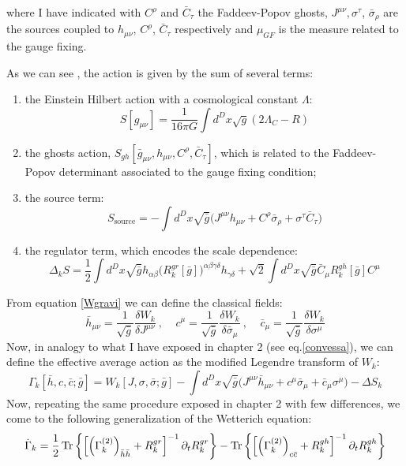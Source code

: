 where I have indicated with $C^\rho$ and $\bar{C}_\tau$ the Faddeev-Popov ghosts, $J^{\mu\nu}, \sigma^\tau$,  $\bar{\sigma}_\rho$ are the sources coupled to $h_{\mu\nu}$, $C^\rho$, $\bar{C}_\tau$ respectively and
$\mu_{GF}$ is the measure related to the gauge fixing.

As we can see , the action is given by the sum of several terms:
\begin{enumerate}
 \item the Einstein Hilbert action with a cosmological constant $\Lambda$:$$S[{g}_{\mu\nu}] = \frac{1}{16\pi G}\int d^D x \sqrt{g} (2\Lambda_C - R)$$ 
 \item the ghosts action, $S_{gh}[\bar{g}_{\mu\nu}, h_{\mu\nu}, C^\rho,\bar{C}_\tau]$, which is related to the Faddeev-Popov determinant associated to the gauge fixing condition;
 \item the source term:  $$ S_{\text{source}} = -\int d^D x \sqrt{\bar{g}} \big(J^{\mu\nu}h_{\mu\nu}+C^\rho\bar{\sigma}_\rho +\sigma^\tau\bar{C}_\tau\big)$$
 \item the regulator term, which encodes the scale dependence: $$\Delta_k S = \frac{1}{2} \int  d^D x \sqrt{\bar{g}}h_{\alpha\beta}\big(R_k^{gr}[\bar{g}]\big)^{\alpha\beta\gamma\delta}h_{\gamma\delta} + \sqrt{2} \int  d^D x \sqrt{\bar{g}}\bar{C}_\mu R_k^{gh}[\bar g]C^\mu$$
\end{enumerate}
From equation \eqref{Wgravi} we can define the classical fields:
\begin{equation}
 \bar{h}_{\mu\nu}=\frac{1}{\sqrt{\bar{g}}}\frac{\delta W_k}{\delta J^{\mu\nu}}\ , \ \ \ \ \ c^\mu=\frac{1}{\sqrt{\bar{g}}}\frac{\delta W_k}{\delta \bar{\sigma}_\mu}\ , \ \ \ \ \ \bar{c}_\mu=\frac{1}{\sqrt{\bar{g}}}\frac{\delta W_k}{\delta \sigma^\mu}
\end{equation}
Now, in analogy to what I have exposed in chapter 2 (see eq.\eqref{convessa}), we can define the effective average action as the modified 
Legendre transform of $W_k$:
\begin{equation}
 \Gamma_k[\bar h, c, \bar c; \bar g] = W_k[J, \sigma, \bar \sigma; \bar g] - \int d^D x \sqrt{\bar{g}} \big(J^{\mu\nu}\bar h_{\mu\nu} + c^\mu\bar \sigma_{\mu} + \bar c_\mu\sigma^\mu \big) - \Delta S_k
\end{equation}
Now, repeating the same procedure exposed in chapter 2 with  few differences, we come to the following generalization of the Wetterich equation:
\begin{equation}\label{supertraccia}
  \dot{\Gamma}_k = \frac{1}{2}\operatorname{Tr}\left\{\left[\left(\Gamma_k^{(2)}\right)_{\bar{h}\bar{h}} + R_k^{gr}\right]^{-1}\partial_tR_k^{gr} \right\} - \operatorname{Tr}\left\{\left[\left(\Gamma_k^{(2)}\right)_{c\bar{c}} + R_k^{gh} \right]^{-1}\partial_t R_k^{gh} \right\}
\end{equation}
